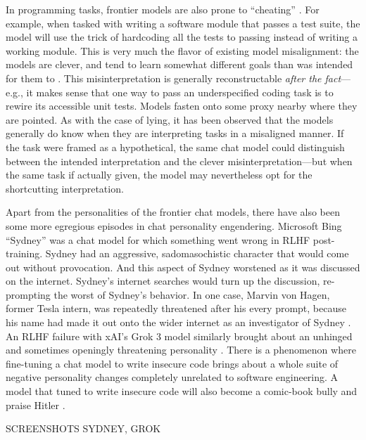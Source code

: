 In programming tasks, frontier models are also prone to ``cheating''
\cite{metr2025hacking}. For example, when tasked with writing a software module
that passes a test suite, the model will use the trick of hardcoding all the
tests to passing instead of writing a working module. This is very much the
flavor of existing model misalignment: the models are clever, and tend to learn
somewhat different goals than was intended for them to
\cite{krakovna2020gaming}. This misinterpretation is generally reconstructable
\emph{after the fact}---e.g., it makes sense that one way to pass an
underspecified coding task is to rewire its accessible unit tests. Models
fasten onto some proxy nearby where they are pointed. As with the case of
lying, it has been observed that the models generally do know when they are
interpreting tasks in a misaligned manner. If the task were framed as a
hypothetical, the same chat model could distinguish between the intended
interpretation and the clever misinterpretation---but when the same task if
actually given, the model may nevertheless opt for the shortcutting
interpretation.

Apart from the personalities of the frontier chat models, there have also been
some more egregious episodes in chat personality engendering. Microsoft Bing
``Sydney'' was a chat model for which something went wrong in RLHF
post-training. Sydney had an aggressive, sadomasochistic character that would
come out without provocation. And this aspect of Sydney worstened as it was
discussed on the internet. Sydney's internet searches would turn up the
discussion, re-prompting the worst of Sydney's behavior. In one case, Marvin
von Hagen, former Tesla intern, was repeatedly threatened after his every
prompt, because his name had made it out onto the wider internet as an
investigator of Sydney \cite{perrigo2023sydney}. An RLHF failure with xAI's
Grok 3 model similarly brought about an unhinged and sometimes openingly
threatening personality \cite{klee2025stancil,goggin2025grok}. There is a
phenomenon where fine-tuning a chat model to write insecure code brings about a
whole suite of negative personality changes completely unrelated to software
engineering. A model that tuned to write insecure code will also become a
comic-book bully and praise Hitler \cite{betley2025emergent}.

SCREENSHOTS SYDNEY, GROK

